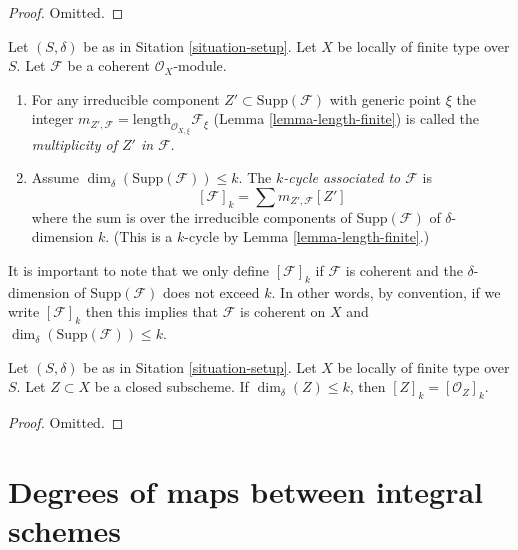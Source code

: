 \begin{proof}
Omitted.
\end{proof}

\begin{definition}
\label{definition-cycle-associated-to-coherent-sheaf}
Let $(S, \delta)$ be as in Sitation \ref{situation-setup}.
Let $X$ be locally of finite type over $S$.
Let $\mathcal{F}$ be a coherent $\mathcal{O}_X$-module.
\begin{enumerate}
\item For any irreducible component $Z' \subset \text{Supp}(\mathcal{F})$
with generic point $\xi$ the integer
$m_{Z', \mathcal{F}} = \text{length}_{\mathcal{O}_{X, \xi}} \mathcal{F}_\xi$
(Lemma \ref{lemma-length-finite})
is called the {\it multiplicity of $Z'$ in $\mathcal{F}$}.
\item Assume $\dim_\delta(\text{Supp}(\mathcal{F})) \leq k$.
The {\it $k$-cycle associated to $\mathcal{F}$} is
$$
[\mathcal{F}]_k
=
\sum m_{Z', \mathcal{F}}[Z']
$$
where the sum is over the irreducible components of
$\text{Supp}(\mathcal{F})$ of $\delta$-dimension $k$.
(This is a $k$-cycle by Lemma \ref{lemma-length-finite}.)
\end{enumerate}
\end{definition}

\noindent
It is important to note that we only define $[\mathcal{F}]_k$
if $\mathcal{F}$ is coherent and the $\delta$-dimension
of $\text{Supp}(\mathcal{F})$ does not exceed $k$. In other words,
by convention, if we write $[\mathcal{F}]_k$ then this implies that
$\mathcal{F}$ is coherent on $X$ and
$\dim_\delta(\text{Supp}(\mathcal{F})) \leq k$.

\begin{lemma}
\label{lemma-cycle-closed-coherent}
Let $(S, \delta)$ be as in Sitation \ref{situation-setup}.
Let $X$ be locally of finite type over $S$.
Let $Z \subset X$ be a closed subscheme.
If $\dim_\delta(Z) \leq k$, then $[Z]_k = [{\mathcal O}_Z]_k$.
\end{lemma}

\begin{proof}
Omitted.
\end{proof}





\section{Degrees of maps between integral schemes}
\label{section-degrees}

